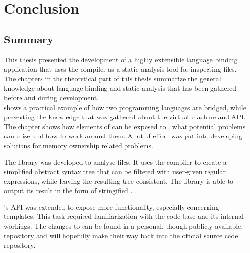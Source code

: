 \part{\hspace{5pt}Conclusion}
\chapter{Summary}
\label{chap:Summary}

This thesis presented the development of a highly extensible language binding application that uses the  compiler as a static analysis tool for inspecting  files.\\
The chapters in the theoretical part of this thesis summarize the general knowledge about language binding and static analysis that has been gathered before and during development.\\
 shows a practical example of how two programming languages are bridged, while presenting the knowledge that was gathered about the   virtual machine and API. The chapter shows how elements of  can be exposed to , what potential problems can arise and how to work around them. A lot of effort was put into developing solutions for memory ownership related problems.

The  library was developed to analyse  files. It uses the  compiler to create a simplified abstract syntax tree that can be filtered with user-given regular expressions, while leaving the resulting tree consistent. The library is able to output its result in the form of stringified .

's  API was extended to expose more  functionality, especially concerning  templates. This task required familiarization with the  code base and its internal workings. The changes to  can be found in a personal, though publicly available,  repository and will hopefully make their way back into the official  source code repository.

